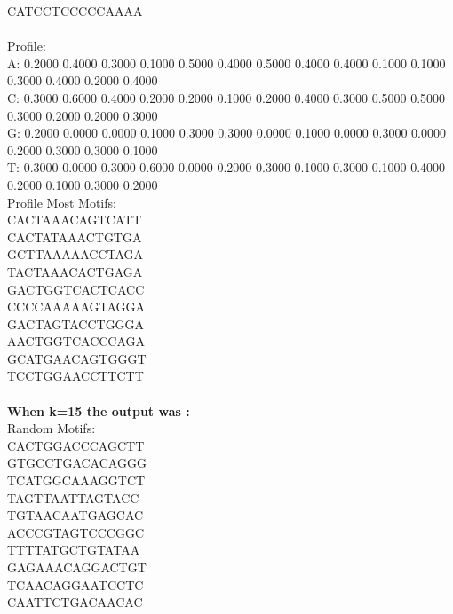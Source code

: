 \documentclass{report}
\begin{document}
CATCCTCCCCCAAAA\\
\\
Profile:\\
A: 0.2000 0.4000 0.3000 0.1000 0.5000 0.4000 0.5000 0.4000 0.4000 0.1000 0.1000 0.3000 0.4000 0.2000 0.4000\\
C: 0.3000 0.6000 0.4000 0.2000 0.2000 0.1000 0.2000 0.4000 0.3000 0.5000 0.5000 0.3000 0.2000 0.2000 0.3000\\
G: 0.2000 0.0000 0.0000 0.1000 0.3000 0.3000 0.0000 0.1000 0.0000 0.3000 0.0000 0.2000 0.3000 0.3000 0.1000\\
T: 0.3000 0.0000 0.3000 0.6000 0.0000 0.2000 0.3000 0.1000 0.3000 0.1000 0.4000 0.2000 0.1000 0.3000 0.2000\\

Profile Most Motifs:\\
CACTAAACAGTCATT\\
CACTATAAACTGTGA\\
GCTTAAAAACCTAGA\\
TACTAAACACTGAGA\\
GACTGGTCACTCACC\\
CCCCAAAAAGTAGGA\\
GACTAGTACCTGGGA\\
AACTGGTCACCCAGA\\
GCATGAACAGTGGGT\\
TCCTGGAACCTTCTT\\
\\
\textbf{When k=15 the output was :}\\
Random Motifs:\\
CACTGGACCCAGCTT\\
GTGCCTGACACAGGG\\
TCATGGCAAAGGTCT\\
TAGTTAATTAGTACC\\
TGTAACAATGAGCAC\\
ACCCGTAGTCCCGGC\\
TTTTATGCTGTATAA\\
GAGAAACAGGACTGT\\
TCAACAGGAATCCTC\\
CAATTCTGACAACAC\\
\end{document}
